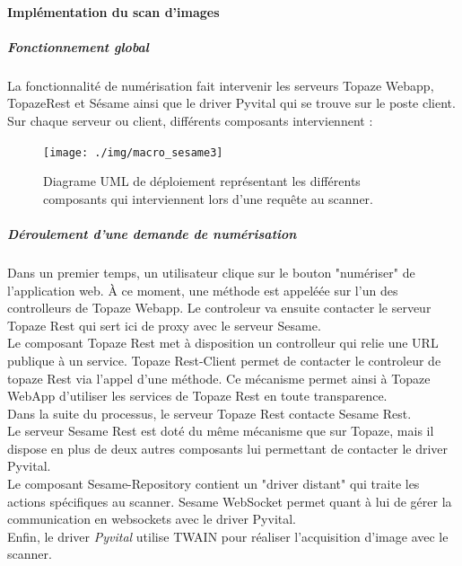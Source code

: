 \paragraph*{Implémentation du scan d'images}
\subparagraph*{Fonctionnement global}
La fonctionnalité de numérisation fait intervenir les serveurs Topaze Webapp, TopazeRest et Sésame ainsi que le driver Pyvital qui se trouve sur le poste client.
Sur chaque serveur ou client, différents composants interviennent :
\begin{figure}[H]
  \centering
  \texttt{[image: ./img/macro\_sesame3]}
  \caption{\label{fig:mb_va_ast} Diagrame UML de déploiement représentant les différents composants qui interviennent lors d'une requête au scanner.}
\end{figure}

\subparagraph*{Déroulement d'une demande de numérisation}
Dans un premier temps, un utilisateur clique sur le bouton "numériser" de l'application web. À ce moment, une méthode est appeléée sur l'un des controlleurs de Topaze Webapp. Le controleur va ensuite contacter le serveur Topaze Rest qui sert ici de proxy avec le serveur Sesame. \\
Le composant Topaze Rest met à disposition un controlleur qui relie une URL publique à un service. Topaze Rest-Client permet de contacter le controleur de topaze Rest via l'appel d'une méthode. Ce mécanisme permet ainsi à Topaze WebApp d'utiliser les services de Topaze Rest en toute transparence. \\
Dans la suite du processus, le serveur Topaze Rest contacte Sesame Rest. \\
Le serveur Sesame Rest est doté du même mécanisme que sur Topaze, mais il dispose en plus de deux autres composants lui permettant de contacter le driver Pyvital.\\
Le composant Sesame-Repository contient un "driver distant" qui traite les actions spécifiques au scanner. Sesame WebSocket permet quant à lui de gérer la communication en websockets avec le driver Pyvital.\\
Enfin, le driver \textit{Pyvital} utilise TWAIN pour réaliser l'acquisition d'image avec le scanner.\\

